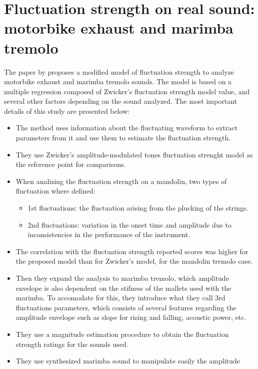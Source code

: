 \section{Fluctuation strength on real sound: motorbike exhaust and marimba
    tremolo}

The paper by \citet{Miura2013Fluctuation} proposes a modified model of
fluctuation strength to analyze motorbike exhaust and marimba tremolo sounds.
The model is based on a multiple regression composed of Zwicker's fluctuation
strength model value, and several other factors depending on the sound
analyzed. The most important details of this study are presented below:

\begin{itemize}
    \item The method uses information about the fluctuating waveform to extract
        parameters from it and use them to estimate the fluctuation strength.
    \item They use Zwicker's amplitude-modulated tones fluctuation strenght
        model as the reference point for comparisons.
    \item When analizing the fluctuation strength on a mandolin, two types of
        fluctuation where defined:
        \begin{itemize}
            \item 1st fluctuations: the fluctuation arising from the plucking of
                the strings.
            \item 2nd fluctuations: variation in the onset time and amplitude
                due to inconsistencies in the performance of the instrument.
        \end{itemize}
    \item The correlation with the fluctuation strength reported scores was
        higher for the proposed model than for Zwicker's model, for the mandolin
        tremolo case.
    \item Then they expand the analysis to marimba tremolo, which amplitude
        envelope is also dependent on the stifness of the mallets used with the
        marimba. To accomodate for this, they introduce what they call 3rd
        fluctuations parameters, which consists of several features regarding
        the amplitude envelope such as slope for rising and falling, acoustic
        power, etc.
    \item They use a magnitude estimation procedure to obtain the fluctuation
        strength ratings for the sounds used.
    \item They use synthesized marimba sound to manipulate easily the amplitude

\end{itemize}
